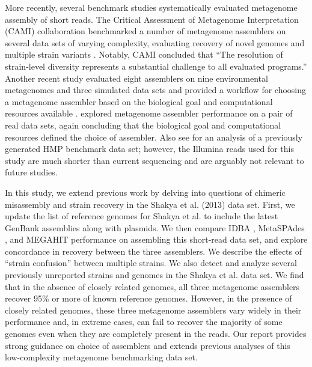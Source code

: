 \documentclass[11pt]{article}
\begin{document}

More recently, several benchmark studies systematically evaluated
metagenome assembly of short reads.  The Critical Assessment of
Metagenome Interpretation (CAMI) collaboration benchmarked a number of
metagenome assemblers on several data sets of varying complexity,
evaluating recovery of novel genomes and multiple strain variants
\cite{CAMI}.  Notably, CAMI concluded that ``The resolution of
strain-level diversity represents a substantial challenge to all
evaluated programs.''  Another recent study evaluated eight assemblers
on nine environmental metagenomes and three simulated data sets and
provided a workflow for choosing a metagenome assembler based on the
biological goal and computational resources available
\cite{metag_one}.  \cite{Vollmers2017} explored metagenome assembler
performance on a pair of real data sets, again concluding that the
biological goal and computational resources defined the choice of
assembler.  Also see \cite{Greenwald2017} for an analysis of a previously
generated HMP benchmark data set; however, the Illumina reads used for this
study are much shorter than current sequencing and are arguably not relevant
to future studies.

In this study, we extend previous work by delving into questions of
chimeric misassembly and strain recovery in the Shakya et al. (2013)
data set.  First, we update the list of reference genomes for Shakya
et al. to include the latest GenBank assemblies along with
plasmids. We then compare IDBA \cite{idba}, MetaSPAdes \cite{metaspades},
and MEGAHIT \cite{megahit} performance on assembling this short-read
data set, and explore concordance in recovery between the three
assemblers.  We describe the effects of ``strain confusion'' between
multiple strains.  We also detect and analyze several previously
unreported strains and genomes in the Shakya et al. data set.  We find
that in the absence of closely related genomes, all three metagenome
assemblers recover 95\% or more of known reference genomes.  However,
in the presence of closely related genomes, these three metagenome
assemblers vary widely in their performance and, in extreme cases, can
fail to recover the majority of some genomes even when they are
completely present in the reads.  Our report provides strong guidance
on choice of assemblers and extends previous analyses of this
low-complexity metagenome benchmarking data set.

\end{document}

